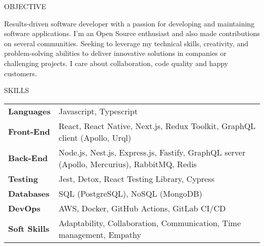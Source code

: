 \documentclass{resume} %
\begin{document}

\begin{rSection}{OBJECTIVE}

{Results-driven software developer with a passion for developing and maintaining software applications. I'm an Open Source enthusiast and also made contributions on several communities. Seeking to leverage my technical skills, creativity, and problem-solving abilities to deliver innovative solutions in companies or challenging projects. I care about collaboration, code quality and happy customers. }


\end{rSection}

\begin{rSection}{SKILLS}

\begin{tabular}{ @{} >{\bfseries}l @{\hspace{6ex}} l }
Languages & Javascript, Typescript\\
Front-End & React, React Native, Next.js, Redux Toolkit, GraphQL client (Apollo, Urql)\\
Back-End & Node.js, Nest.js, Express.js, Fastify, GraphQL server (Apollo, Mercurius), RabbitMQ, Redis\\
Testing & Jest, Detox, React Testing Library, Cypress\\
Databases & SQL (PostgreSQL), NoSQL (MongoDB)\\
DevOps & AWS, Docker, GitHub Actions, GitLab CI/CD\\
Soft Skills & Adaptability, Collaboration, Communication, Time management, Empathy\\
\end{tabular}\\
\end{rSection}
\end{document}
